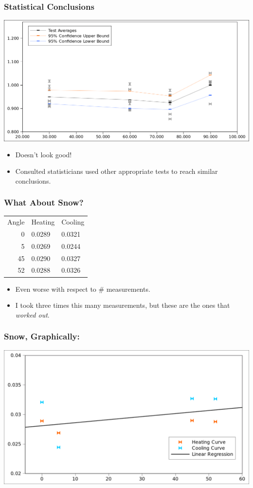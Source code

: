 \documentclass{beamer}
\begin{document}
\begin{frame}
\frametitle{Statistical Conclusions}
\includegraphics[width=\textwidth]{fig/test_results_confidence.png}
\begin{itemize}
\item Doesn't look good!
\item Consulted statisticians used other appropriate tests to reach similar conclusions.
\end{itemize}
\end{frame}


\begin{frame}
\frametitle{What About Snow?}
\begin{tabular}{r | l l}
Angle & Heating & Cooling\\
0 & 0.0289 & 0.0321\\
5 & 0.0269 & 0.0244\\
45 & 0.0290 & 0.0327\\
52 & 0.0288 & 0.0326\\
\end{tabular}
\begin{itemize}
\item Even worse with respect to \# measurements.
\item I took three times this many measurements, but these are the ones that \emph{worked out}.
\end{itemize}
\end{frame}


\begin{frame}
\frametitle{Snow, Graphically:}
\includegraphics[width=\textwidth]{fig/snow_meas.png}
\end{frame}
\end{document}
